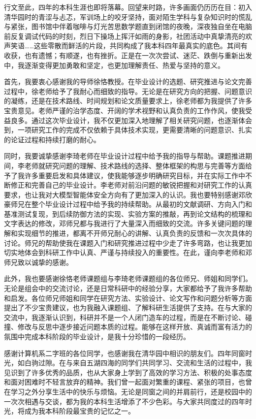 
\begin{acknowledgements}
  行文至此，四年的本科生涯也即将落幕。回望来时路，许多画面仍历历在目：初入清华园时的青涩与忐忑，军训场上的咬牙坚持，面对陌生学科与复杂知识时的慌乱与紧张，图书馆中伴着咖啡与灯光苦思数学题直到闭馆的夜晚，深夜独自坐在电脑前反复调试代码的时刻，烈日下操场上挥汗如雨的身影，社团活动中真挚清亮的欢声笑语……这些零散而鲜活的片段，共同构成了我本科四年最真实的底色。其间有收获，也有遗憾；有顺遂，也有挫折。正是在一次次尝试、迷茫、跌倒与重新出发中，我逐渐变得更加勇敢和坚定，也更加理解责任、热爱与坚持的意义。

  首先，我要衷心感谢我的导师徐恪教授。在毕业设计的选题、研究推进与论文完善过程中，徐老师给予了我耐心而细致的指导。无论是在研究方向的把握、问题意识的凝练，还是在技术路线、时间规划和论文质量要求上，徐老师都为我提供了许多宝贵意见。老师严谨的治学态度、开阔的学术视野和认真负责的工作作风，使我受益良多。通过这次毕业设计，我不仅更加深入地理解了相关研究问题，也逐渐体会到，一项研究工作的完成不仅依赖于具体技术实现，更需要清晰的问题意识、扎实的论证过程和持续打磨的耐心。

  同时，我要诚挚感谢李琦老师在毕业设计过程中给予我的指导与帮助。课题推进期间，李老师就研究问题的理解、技术路线的选择、整体框架的构思与完善等方面给予了我许多重要启发和具体建议，使我能够逐步明确研究目标，并在实际工作中不断修正和完善自己的毕业设计。李老师对前沿问题的敏锐把握和对研究工作的认真要求，也让我对大模型智能体安全方向有了更加深入的认识。我也要特别感谢邓欣豪师兄在整个毕业设计过程中给予我的持续帮助。从最初的文献调研、方向入门和基准测试复现，到后续防御方法的实现、实验方案的推敲，再到论文结构的梳理和文字表达的修改，邓师兄都与我进行了大量深入而细致的交流。许多关键问题的理解和实现细节的推进，都离不开师兄耐心的讲解、认真负责的反馈和一次次具体的讨论。师兄的帮助使我在课题入门和研究推进过程中少走了许多弯路，也让我更加切实地体会到科研工作中认真、严谨与持续投入的重要性。在此，谨向李老师和邓师兄致以诚挚的感谢。

  此外，我也要感谢徐恪老师课题组与李琦老师课题组的各位师兄、师姐和同学们。无论是组会中的交流讨论，还是日常科研中的经验分享，大家都给予了我许多帮助和启发。各位师兄师姐和同学在研究方法、实验设计、论文写作和问题分析等方面提出了不少宝贵建议，也为我融入课题组、了解科研生活提供了支持。在与大家的交流中，我逐渐认识到，科研并不是一个人闭门造车的过程，而是在不断讨论、碰撞、修改与反思中逐步接近问题本质的过程。能够在这样开放、真诚而富有活力的氛围中完成本科阶段的毕业设计，是我十分珍惜的一段经历。

  感谢计算机系二字班的各位同学，也感谢我在清华园中相识的朋友们。四年同窗时光，如白驹过隙。在与来自五湖四海的同学们共同学习、交流和生活的过程中，我见识到了许多优秀的品质，也从大家身上学到了高效的学习方法、积极的处事态度和面对困难时不轻言放弃的精神。我们曾一起面对繁重的课程、紧张的项目，也曾在学习之外分享生活中的快乐与烦恼。无论是同窗之间的并肩前行，还是校园中的一次次相遇与交谈，都为我的本科生活增添了不少色彩。与大家共同度过的四年时光，将成为我本科阶段最宝贵的记忆之一。


\end{acknowledgements}
